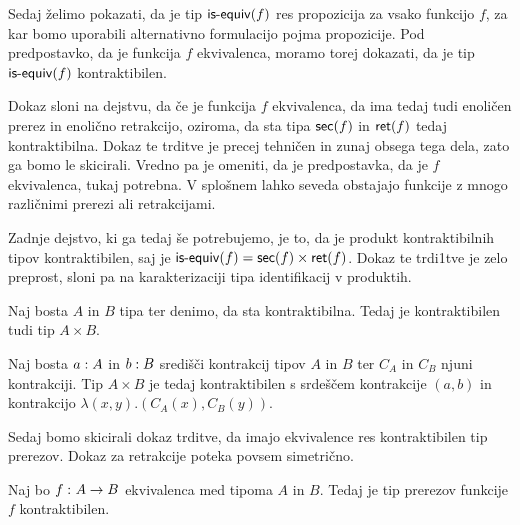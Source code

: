Sedaj želimo pokazati, da je tip \(\textnormal{\textsf{is-equiv}}(f)\) res propozicija za vsako funkcijo \(f\), za kar bomo uporabili alternativno formulacijo pojma propozicije. Pod predpostavko, da je funkcija \(f\) ekvivalenca, moramo torej dokazati, da je tip \(\textnormal{\textsf{is-equiv}}(f)\) kontraktibilen.

Dokaz sloni na dejstvu, da če je funkcija \(f\) ekvivalenca, da ima tedaj tudi enoličen prerez in enolično retrakcijo, oziroma, da sta tipa \(\textnormal{\textsf{sec}}(f)\) in \(\textnormal{\textsf{ret}}(f)\) tedaj kontraktibilna.
Dokaz te trditve je precej tehničen in zunaj obsega tega dela, zato ga bomo le skicirali. Vredno pa je omeniti, da je predpostavka, da je \(f\) ekvivalenca, tukaj potrebna. V splošnem lahko seveda obstajajo funkcije z mnogo različnimi prerezi ali retrakcijami.

Zadnje dejstvo, ki ga tedaj še potrebujemo, je to, da je produkt kontraktibilnih tipov kontraktibilen, saj je \(\textnormal{\textsf{is-equiv}}(f) = \textnormal{\textsf{sec}}(f) \times \textnormal{\textsf{ret}}(f)\). Dokaz te trdi1tve je zelo preprost, sloni pa na karakterizaciji tipa identifikacij v produktih.

\begin{trditev}
  Naj bosta \(A\) in \(B\) tipa ter denimo, da sta kontraktibilna. Tedaj je kontraktibilen tudi tip \(A \times B\).
\end{trditev}

\begin{dokaz}
  Naj bosta \(a : A\) in \(b : B\) središči kontrakcij tipov \(A\) in \(B\) ter \(C_{A}\) in \(C_{B}\) njuni kontrakciji. Tip \(A \times B\) je tedaj kontraktibilen s srdeščem kontrakcije \((a, b)\) in kontrakcijo \(\lambda(x, y).(C_{A}(x), C_{B}(y))\).
\end{dokaz}

Sedaj bomo skicirali dokaz trditve, da imajo ekvivalence res kontraktibilen tip prerezov. Dokaz za retrakcije poteka povsem simetrično.

\begin{trditev}
  \label{contr-sec-of-equiv}
  Naj bo \(f \,\colon A \to B\) ekvivalenca med tipoma \(A\) in \(B\). Tedaj je tip prerezov funkcije \(f\) kontraktibilen.
\end{trditev}

